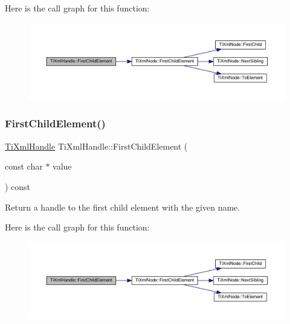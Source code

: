 Here is the call graph for this function\+:
\nopagebreak
\begin{figure}[H]
\begin{center}
\leavevmode
\includegraphics[width=350pt]{class_ti_xml_handle_af0643f8683f3f2b779b8c9d78c67b2c0_cgraph}
\end{center}
\end{figure}
\mbox{\label{class_ti_xml_handle_a3eaf2d2d4c087cd8a48da261042e75bc}} 
\subsubsection{\texorpdfstring{First\+Child\+Element()}{FirstChildElement()}\hspace{0.1cm}{\footnotesize\ttfamily [2/2]}}
{\footnotesize\ttfamily \hyperlink{class_ti_xml_handle}{Ti\+Xml\+Handle} Ti\+Xml\+Handle\+::\+First\+Child\+Element (\begin{DoxyParamCaption}\item[{const char $\ast$}]{value }\end{DoxyParamCaption}) const}



Return a handle to the first child element with the given name. 

Here is the call graph for this function\+:
\nopagebreak
\begin{figure}[H]
\begin{center}
\leavevmode
\includegraphics[width=350pt]{class_ti_xml_handle_a3eaf2d2d4c087cd8a48da261042e75bc_cgraph}
\end{center}
\end{figure}
\mbox{\label{class_ti_xml_handle_aec0e3ea58ff98a45cd13507a02e2ca1e}} 
